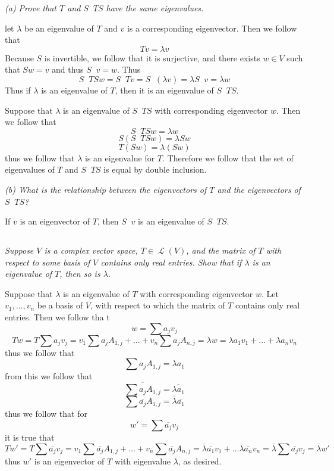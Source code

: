 \documentclass[11pt,oneside,titlepage]{book}
\DeclareMathOperator \map {\mathcal {L}}
\DeclareMathOperator \inv {^{-1}}
\begin{document}
\textit{(a) Prove that $T$ and $S \inv T S$ have the same eigenvalues.}

let $\lambda$ be an eigenvalue of $T$ and $v$ is a corresponding eigenvector. Then we follow that
$$Tv = \lambda v$$
Because $S$ is invertible, we follow that it is surjective, and
there exists $w \in V$ such that $Sw = v$ and thus $S \inv v = w$. Thus
$$S \inv T S w = S \inv T v = S \inv (\lambda v) = \lambda  S \inv v = \lambda w$$
Thus if $\lambda$ is an eigenvalue of $T$, then it is an eigenvalue of $S \inv T S$.

Suppose that $\lambda$ is an eigenvalue of $S \inv T S$ with corresponding eigenvector $w$.
Then we follow that
$$S \inv T S w = \lambda w$$
$$S (S \inv T S w) = \lambda S w$$
$$T (S w) = \lambda (S w)$$
thus we follow that $\lambda$ is an eigenvalue for $T$. Therefore we follow that the set of
eigenvalues of $T$ and $S \inv T S$ is equal by double inclusion.

\textit{(b) What is the relationship between the eigenvectors of $T$ and the eigenvectors
  of $S \inv T S$?}

If $v$ is an eigenvector of $T$, then $S\inv v$ is an eigenvalue of $S \inv T S$.

\subsection{}

\textit{Suppose $V$ is a complex vector space, $T \in \map(V)$, and the matrix of $T$ with
  respect to some basis of $V$ contains only real entries. Show that if $\lambda$ is an eigenvalue
  of $T$, then so is $\overline{\lambda}$.}

Suppose that $\lambda$ is an eigenvalue of $T$ with corresponding eigenvector $w$. Let
$v_1, ..., v_n$ be a basis of $V$, with respect to which the matrix of $T$ contains only
real entries. Then we follow tha t
$$w = \sum{a_j v_j}$$
$$T w = T \sum{a_j v_j} = v_1 {\sum a_j A_{1, j} }  + ... + v_n {\sum a_j A_{n, j} } = \lambda w
= \lambda a_1 v_ 1 + ... + \lambda a_n v_n$$
thus we follow that
$${\sum a_j A_{1, j} } = \lambda a_1$$
from this we follow that 
$$\overline{{\sum a_j A_{1, j} }} = \overline{\lambda a_1}$$
$${\sum \overline{a_j} A_{1, j} } = \overline{\lambda} \overline{ a_1}$$
thus we follow that for
$$w' = \sum{\overline{a_j} v_j}$$
it is true that
$$Tw' = T \sum{\overline{a_j} v_j} = v_1 {\sum \overline{a_j} A_{1, j} }
+ ... + v_n {\sum \overline{a_j} A_{n, j}} = \overline{\lambda} \overline{a_1} v_1  + ...
\overline{\lambda} \overline{a_n} v_n = \overline{\lambda} \sum{\overline{a_j} v_j} =
\overline{\lambda} w' $$
thus $w'$ is an eigenvector of $T$ with eigenvalue $\overline{\lambda}$, as desired.
\end{document}

